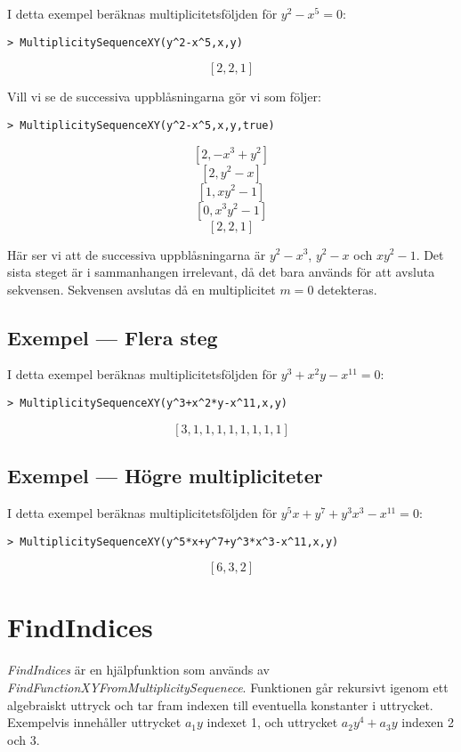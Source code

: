 I detta exempel beräknas multiplicitetsföljden för $y^2 - x^5 = 0$:

\begin{verbatim}
> MultiplicitySequenceXY(y^2-x^5,x,y)
\end{verbatim}
\[\left[2, 2, 1\right]\]

Vill vi se de successiva uppblåsningarna gör vi som följer:

\begin{verbatim}
> MultiplicitySequenceXY(y^2-x^5,x,y,true)
\end{verbatim}
\[[2,-x^3+y^2]\]
\[[2,y^2-x]\]
\[[1,xy^2-1]\]
\[[0,x^3y^2-1]\]
\[\left[2, 2, 1\right]\]

Här ser vi att de successiva uppblåsningarna är $y^2-x^3$, $y^2-x$ och $xy^2-1$. Det sista steget är i sammanhangen irrelevant, då det bara används för att avsluta sekvensen. Sekvensen avslutas då en multiplicitet $m=0$ detekteras.

\subsection{Exempel --- Flera steg}
\label{MultiplicitySequenceXYEx2}

I detta exempel beräknas multiplicitetsföljden för $y^3 + x^2y - x^{11} = 0$:

\begin{verbatim}
> MultiplicitySequenceXY(y^3+x^2*y-x^11,x,y)
\end{verbatim}
\[[3, 1, 1, 1, 1, 1, 1, 1, 1]\]

\subsection{Exempel --- Högre multipliciteter}
\label{MultiplicitySequenceXYEx3}

I detta exempel beräknas multiplicitetsföljden för $y^5x+y^7+y^3x^3-x^{11} = 0$:

\begin{verbatim}
> MultiplicitySequenceXY(y^5*x+y^7+y^3*x^3-x^11,x,y)
\end{verbatim}
\[[6, 3, 2]\]

\section{FindIndices}

\emph{FindIndices} är en hjälpfunktion som används av \emph{FindFunctionXYFromMultiplicitySequenece}. Funktionen går rekursivt igenom ett algebraiskt uttryck och tar fram indexen till eventuella konstanter i uttrycket. Exempelvis innehåller uttrycket $a_1y$ indexet 1, och uttrycket $a_2y^4 + a_3y$ indexen 2 och 3.

